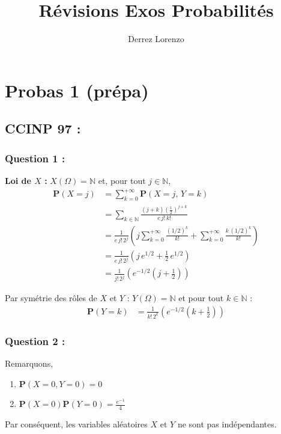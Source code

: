\documentclass{article}
\title{Révisions Exos Probabilités}
\author{Derrez Lorenzo}
\begin{document}
\maketitle

\section*{\textbf{Probas 1} (prépa)}

\subsection*{\textbf{CCINP 97} :}
\subsubsection*{Question 1 :}


\textbf{Loi de $X$ :} $X(\Omega) = \mathbb{N}$ et, pour tout $j \in \mathbb{N}$,
\begin{align*}
    \mathbf{P}(X=j) &= \sum_{k=0}^{+\infty} \mathbf{P}(X=j,\, Y=k) \\
                    &= \sum_{k \in \mathbb{N}} \frac{(j+k)\left(\frac{1}{2}\right)^{j+k}}{e\, j!\, k!} \\
                    &= \frac{1}{e\, j!\, 2^j} \left( j \sum_{k=0}^{+\infty} \frac{(1/2)^k}{k!} + \sum_{k=0}^{+\infty} \frac{k\,(1/2)^k}{k!} \right) \\
                    &= \frac{1}{e\, j!\, 2^j} \left( j\, e^{1/2} + \frac{1}{2}\, e^{1/2} \right) \\
                    &= \frac{1}{j!\, 2^j} \left( e^{-1/2} (j + \frac{1}{2}) \right)
\end{align*}

Par symétrie des rôles de $X$ et $Y$ :
$Y(\Omega) = \mathbb{N}$ et pour tout $k \in \mathbb{N}$ :
\begin{align*}
    \mathbf{P}(Y=k) &= \frac{1}{k!\, 2^k} \left( e^{-1/2} (k + \frac{1}{2}) \right)
\end{align*}

\subsubsection*{Question 2 :}
Remarquons,
\\
\begin{enumerate}
    \item $\mathbf{P}(X=0, Y=0) = 0$
    \item $\mathbf{P}(X=0)\mathbf{P}(Y=0) = \frac{e^{-1}}{4} $
\end{enumerate}

Par conséquent, les variables aléatoires $X$ et $Y$ ne sont pas indépendantes.
\end{document}

